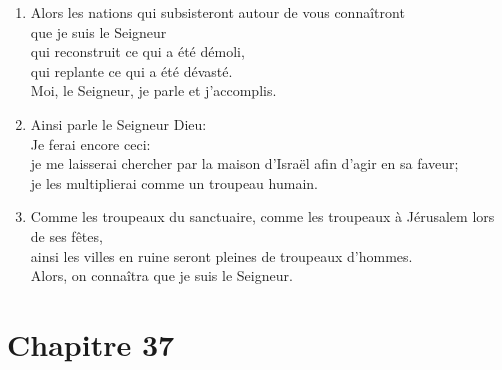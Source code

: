 \begin{enumerate}[leftmargin=\psleftmargin, labelsep = \pslabelsep, label={\arabic*}, font=\color{\pscolor}\small\textsuperscript, parsep=0em, itemsep=0em, topsep=0em ]
\item Alors les nations qui subsisteront autour de vous connaîtront \\ que je suis le Seigneur \\ \decalage qui reconstruit ce qui a été démoli, \\ \decalage qui replante ce qui a été dévasté. \\ Moi, le Seigneur, je parle et j’accomplis. \parSpace
\item  Ainsi parle le Seigneur Dieu: \\ Je ferai encore ceci: \\ je me laisserai chercher par la maison d’Israël afin d’agir en sa faveur; \\ je les multiplierai comme un troupeau humain.
\item Comme les troupeaux du sanctuaire, comme les troupeaux à Jérusalem lors de ses fêtes, \\ ainsi les villes en ruine seront pleines de troupeaux d’hommes. \\ Alors, on connaîtra que je suis le Seigneur.
\end{enumerate}
\newpage

\section*{Chapitre 37}
